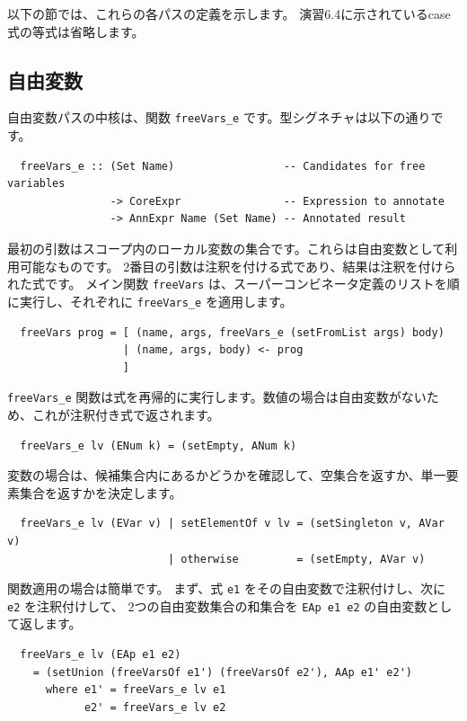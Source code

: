 \documentclass{jbook}
\begin{document}
以下の節では、これらの各パスの定義を示します。
演習6.4に示されているcase式の等式は省略します。

\subsection{自由変数}

自由変数パスの中核は、関数 \texttt{freeVars\_e} です。型シグネチャは以下の通りです。

\begin{verbatim}
  freeVars_e :: (Set Name)                 -- Candidates for free variables
                -> CoreExpr                -- Expression to annotate
                -> AnnExpr Name (Set Name) -- Annotated result
\end{verbatim}

最初の引数はスコープ内のローカル変数の集合です。これらは自由変数として利用可能なものです。
2番目の引数は注釈を付ける式であり、結果は注釈を付けられた式です。
メイン関数 \texttt{freeVars} は、スーパーコンビネータ定義のリストを順に実行し、それぞれに \texttt{freeVars\_e} を適用します。

\begin{verbatim}
  freeVars prog = [ (name, args, freeVars_e (setFromList args) body)
                  | (name, args, body) <- prog
                  ]
\end{verbatim}

\texttt{freeVars\_e} 関数は式を再帰的に実行します。数値の場合は自由変数がないため、これが注釈付き式で返されます。

\begin{verbatim}
  freeVars_e lv (ENum k) = (setEmpty, ANum k)
\end{verbatim}

変数の場合は、候補集合内にあるかどうかを確認して、空集合を返すか、単一要素集合を返すかを決定します。

\begin{verbatim}
  freeVars_e lv (EVar v) | setElementOf v lv = (setSingleton v, AVar v)
                         | otherwise         = (setEmpty, AVar v)
\end{verbatim}

関数適用の場合は簡単です。
まず、式 \texttt{e1} をその自由変数で注釈付けし、次に \texttt{e2} を注釈付けして、
2つの自由変数集合の和集合を \texttt{EAp e1 e2} の自由変数として返します。

\begin{verbatim}
  freeVars_e lv (EAp e1 e2)
    = (setUnion (freeVarsOf e1') (freeVarsOf e2'), AAp e1' e2')
      where e1' = freeVars_e lv e1
            e2' = freeVars_e lv e2
\end{verbatim}
\end{document}
